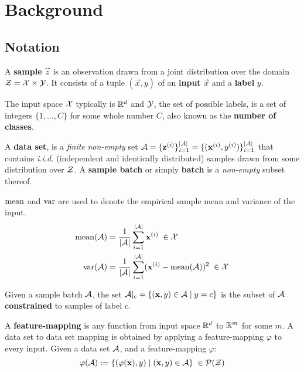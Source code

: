 

\chapter{Background}
\label{chap:Background}

\section{Notation}

A \textbf{sample} $\vec z$ is an observation drawn from a joint distribution over the domain $\mathcal Z = \mathcal X \times \mathcal Y$. 
It consists of a tuple $(\vec x, y)$ of an \textbf{input} $\vec x$ and a \textbf{label} $y$. 

\noindent
The input space $\mathcal X$ typically is $\mathbb{R}^d$ and $\mathcal Y$, the set of possible labels, is a set of integers $\{1, \dots, C\}$ for some whole number $C$, also known as the \textbf{number of classes}.

\noindent
A \textbf{data set}, is a \textit{finite} \textit{non-empty} set $\mathcal A = \{\mathbf z^{(i)}\}_{i=1}^{| \mathcal A |} = \{(\mathbf x^{(i)}, y^{(i)})\}_{i=1}^{| \mathcal A |}$ that contains \textit{i.i.d.} (independent and identically distributed) samples drawn from some distribution over $\mathcal Z$.
A \textbf{sample batch} or simply \textbf{batch} is a \textit{non-empty} subset thereof.

\noindent
$\operatorname{mean}$ and $\operatorname{var}$ are used to denote the empirical sample mean and variance of the input.
\begin{align*}
    \operatorname{mean} ({\mathcal A}) &= \frac 1 {\lvert \mathcal A \rvert} \sum _{i=1}^{\lvert \mathcal A \rvert} \mathbf x^{(i)} \; \in \mathcal X \\
    \operatorname{var} ({\mathcal A}) &= \frac 1 {\lvert \mathcal A \rvert} \sum _{i=1}^{\lvert \mathcal A \rvert} (\mathbf x^{(i)} - \operatorname{mean} ({\mathcal A}))^2 \; \in \mathcal X
\end{align*}


Given a sample batch $\mathcal A$, the set $\mathcal A|_c = \{(\mathbf x, y) \in \mathcal A \mid y = c\}$ is the subset of $\mathcal A$ \textbf{constrained} to samples of label $c$.


A \textbf{feature-mapping} is any function from input space $\mathbb{R}^d$ to $\mathbb{R}^m$ for some $m$.
A data set to data set mapping is obtained by applying a feature-mapping $\varphi$ to every input. Given a data set $\mathcal A$, and a feature-mapping $\varphi$:
\[
    \varphi(\mathcal A) := \{(\varphi(\mathbf x), y) \mid (\mathbf x, y) \in \mathcal A\} \;
    \in \mathcal P(\mathcal Z)
\]



